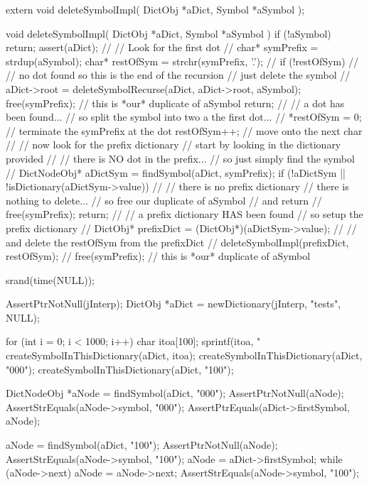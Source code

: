 \startCHeader
extern void deleteSymbolImpl(
  DictObj *aDict,
  Symbol  *aSymbol
);
\stopCHeader
{}

\startCCode
void deleteSymbolImpl(
  DictObj *aDict,
  Symbol  *aSymbol
) {
  if (!aSymbol) return;
  assert(aDict);
  //
  // Look for the first dot
  //
  char* symPrefix = strdup(aSymbol);
  char* restOfSym = strchr(symPrefix, '.');
  //
  if (!restOfSym) {
    //
    // no dot found so this is the end of the recursion
    // just delete the symbol
    //
    aDict->root = 
      deleteSymbolRecurse(aDict, aDict->root, aSymbol);
    free(symPrefix); // this is *our* duplicate of aSymbol
    return;
  }
  //
  // a dot has been found...
  // so split the symbol into two a the first dot...
  //
  *restOfSym = 0; // terminate the symPrefix at the dot
  restOfSym++;    // move onto the next char
  //
  // now look for the prefix dictionary
  // start by looking in the dictionary provided
  //
  // there is NO dot in the prefix...
  // so just simply find the symbol
  //
  DictNodeObj* aDictSym = findSymbol(aDict, symPrefix);
  if (!aDictSym || !isDictionary(aDictSym->value)) {
    //
    // there is no prefix dictionary
    // there is nothing to delete...
    // so free our duplicate of aSymbol
    // and return
    //
    free(symPrefix);
    return;
  }
  //
  // a prefix dictionary HAS been found
  // so setup the prefix dictionary
  //
  DictObj* prefixDict = (DictObj*)(aDictSym->value);
  //
  // and delete the restOfSym from the prefixDict
  //
  deleteSymbolImpl(prefixDict, restOfSym);
  //
  free(symPrefix); // this is *our* duplicate of aSymbol
}
\stopCCode

\startCTest
  srand(time(NULL));

  AssertPtrNotNull(jInterp);
  DictObj *aDict = newDictionary(jInterp, "tests", NULL);

  for (int i = 0; i < 1000; i++) {
    char itoa[100];
    sprintf(itoa, "%
    createSymbolInThisDictionary(aDict, itoa);
  }
  createSymbolInThisDictionary(aDict, "000");
  createSymbolInThisDictionary(aDict, "100");

  DictNodeObj *aNode = findSymbol(aDict, "000");
  AssertPtrNotNull(aNode);
  AssertStrEquals(aNode->symbol, "000");
  AssertPtrEquals(aDict->firstSymbol, aNode);
  
  aNode = findSymbol(aDict, "100");
  AssertPtrNotNull(aNode);
  AssertStrEquals(aNode->symbol, "100");
  aNode = aDict->firstSymbol;
  while (aNode->next) aNode = aNode->next;
  AssertStrEquals(aNode->symbol, "100");
  
